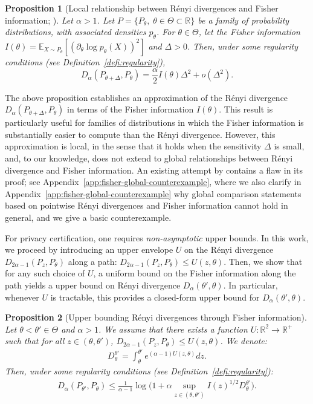 \documentclass{article}
\theoremstyle{plain}
\newtheorem{proposition}{Proposition}[section]
\theoremstyle{definition}
\theoremstyle{remark}
\begin{document}
\begin{proposition}[Local relationship between Rényi divergences and Fisher information; \citealt{Haussler1997, vanErven2014}]
\label{prop:local-fisher}
    Let $\alpha > 1$. Let $P = \{P_\theta,\; \theta\in \Theta \subset \mathbb{R}\}$ be a family of probability distributions, with associated densities $p_\theta$. 
    For $\theta \in \Theta$, let the Fisher information $I(\theta) = \mathbb{E}_{X \sim P_\theta}[(\partial_\theta \log p_\theta(X))^2]$ and $\Delta > 0$. Then, under some regularity conditions (see Definition~\ref{defi:regularity}),
    \[D_\alpha(P_{\theta + \Delta},P_{\theta}) = \frac{\alpha}{2}I(\theta)\Delta^2 + o(\Delta^2).\]
\end{proposition}

The above proposition establishes an approximation of the Rényi divergence $D_\alpha(P_{\theta+\Delta},P_{\theta})$ in terms of the Fisher information $I(\theta)$. This result is particularly useful for families of distributions in which the Fisher information is substantially easier to compute than the Rényi divergence. However, this approximation is local, in the sense that it holds when the sensitivity $\Delta$ is small, and, to our knowledge, does not extend to global relationships between Rényi divergence and Fisher information. An existing attempt by \citet{Abbasnejad2006} contains a flaw in its proof; see Appendix~\ref{app:fisher-global-counterexample}, where we also clarify in Appendix~\ref{app:fisher-global-counterexample} why global comparison statements based on pointwise Rényi divergences and Fisher information cannot hold in general, and we give a basic counterexample.

For privacy certification, one requires \emph{non-asymptotic} upper bounds. In this work, we proceed by introducing an upper envelope $U$ on the Rényi divergence $D_{2\alpha-1}(P_z,P_\theta)$ along a path: $D_{2\alpha-1}(P_z,P_\theta)\leq U(z,\theta)$. Then, we show that for any such choice of $U$, a uniform bound on the Fisher information along the path yields a upper bound on Rényi divergence $D_\alpha(\theta',\theta)$. In particular, whenever $U$ is tractable, this provides a closed-form upper bound for $D_\alpha(\theta',\theta)$.

\begin{proposition}[Upper bounding Rényi divergences through Fisher information]
\label{prop:Fisher-upper-bound}
    Let $\theta < \theta' \in \Theta$ and $\alpha > 1$. We assume that there exists a function $U : \mathbb{R}^2 \to \mathbb{R^+}$ such that for all  $z \in (\theta,\theta')$, $D_{2\alpha-1}(P_{z},P_{\theta}) \leq U(z,\theta)$. We denote: \begin{align*}
        D_\theta^{\theta'} = \int_{\theta}^{\theta'} e^{(\alpha-1)U(z,\theta)}dz.
    \end{align*}  Then, under some regularity conditions (see Definition~\ref{defi:regularity}):
    \begin{align*}
        D_\alpha(P_{\theta'},P_{\theta}) \leq \frac{1}{\alpha-1}\log \bigg( 1 + \alpha \sup_{z \in (\theta,\theta')}I(z)^{1/2} D_\theta^{\theta'}\bigg).
    \end{align*}
\end{proposition}
\end{document}
